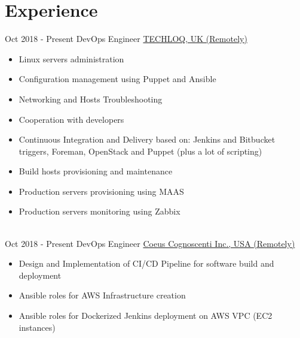 \documentclass[letterpaper]{tenseconds} %
\begin{document}
\section{Experience}
\begin{twenty} %
	\twentyitem
        {Oct 2018 -}
        {Present}
        {DevOps Engineer}
        {\href{https://www.techloq.com/}{TECHLOQ, UK (Remotely)}}
        {}
        {\begin{itemize}
        \item Linux servers administration
        \item Configuration management using Puppet and Ansible
        \item Networking and Hosts Troubleshooting
        \item Cooperation with developers
        \item Continuous Integration and Delivery based on: Jenkins and Bitbucket triggers, Foreman, OpenStack and Puppet (plus a lot of scripting)
        \item Build hosts provisioning and maintenance
        \item Production servers provisioning using MAAS
        \item Production servers monitoring using Zabbix
        \end{itemize}}
        \\
	\twentyitem
        {Oct 2018 -}
        {Present}
        {DevOps Engineer}
        {\href{https://www.google.com/search?q=coueus-congnoscenti-inc}{Coeus Cognoscenti Inc., USA (Remotely)}}
        {}
        {\begin{itemize}
        \item Design and Implementation of CI/CD Pipeline for software build and deployment
        \item Ansible roles for AWS Infrastructure creation
        \item Ansible roles for Dockerized Jenkins deployment on AWS VPC (EC2 instances)
        \end{itemize}}
\end{twenty}
\end{document}
